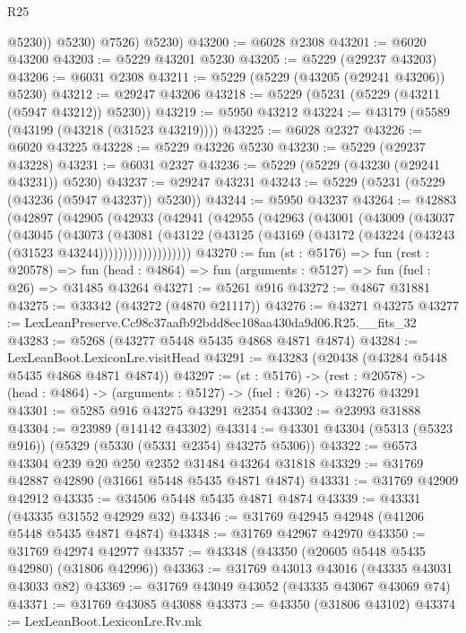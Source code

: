 \begin{lexlean}{R25}
\begin{coremodule}
              @5230))
          @5230)
        @7526)
      @5230)
@43200 := @6028 @2308
@43201 := @6020 @43200
@43203 := @5229 @43201 @5230
@43205 := @5229 (@29237 @43203)
@43206 := @6031 @2308
@43211 := @5229 (@5229 (@43205 (@29241 @43206)) @5230)
@43212 := @29247 @43206
@43218 := @5229 (@5231 (@5229 (@43211 (@5947 @43212)) @5230))
@43219 := @5950 @43212
@43224 := @43179 (@5589 (@43199 (@43218 (@31523 @43219))))
@43225 := @6028 @2327
@43226 := @6020 @43225
@43228 := @5229 @43226 @5230
@43230 := @5229 (@29237 @43228)
@43231 := @6031 @2327
@43236 := @5229 (@5229 (@43230 (@29241 @43231)) @5230)
@43237 := @29247 @43231
@43243 := @5229 (@5231 (@5229 (@43236 (@5947 @43237)) @5230))
@43244 := @5950 @43237
@43264 := @42883
    (@42897
      (@42905
        (@42933
          (@42941
            (@42955
              (@42963
                (@43001
                  (@43009
                    (@43037
                      (@43045
                        (@43073
                          (@43081
                            (@43122
                              (@43125
                                (@43169 (@43172 (@43224 (@43243 (@31523 @43244)))))))))))))))))))
@43270 := fun (st : @5176) =>
  fun (rest : @20578) =>
  fun (head : @4864) => fun (arguments : @5127) => fun (fuel : @26) => @31485 @43264
@43271 := @5261 @916
@43272 := @4867 @31881
@43275 := @33342 (@43272 (@4870 @21117))
@43276 := @43271 @43275
@43277 := LexLeanPreserve.Cc98c37aafb92bdd8ec108aa430da9d06.R25.__fits_32
@43283 := @5268 (@43277 @5448 @5435 @4868 @4871 @4874)
@43284 := LexLeanBoot.LexiconLre.visitHead
@43291 := @43283 (@20438 (@43284 @5448 @5435 @4868 @4871 @4874))
@43297 := (st : @5176) ->
  (rest : @20578) -> (head : @4864) -> (arguments : @5127) -> (fuel : @26) -> @43276 @43291
@43301 := @5285 @916 @43275 @43291 @2354
@43302 := @23993 @31888
@43304 := @23989 (@14142 @43302)
@43314 := @43301 @43304 (@5313 (@5323 @916)) (@5329 (@5330 (@5331 @2354) @43275 @5306))
@43322 := @6573 @43304 @239 @20 @250 @2352 @31484 @43264 @31818
@43329 := @31769 @42887 @42890 (@31661 @5448 @5435 @4871 @4874)
@43331 := @31769 @42909 @42912
@43335 := @34506 @5448 @5435 @4871 @4874
@43339 := @43331 (@43335 @31552 @42929 @32)
@43346 := @31769 @42945 @42948 (@41206 @5448 @5435 @4871 @4874)
@43348 := @31769 @42967 @42970
@43350 := @31769 @42974 @42977
@43357 := @43348 (@43350 (@20605 @5448 @5435 @42980) (@31806 @42996))
@43363 := @31769 @43013 @43016 (@43335 @43031 @43033 @82)
@43369 := @31769 @43049 @43052 (@43335 @43067 @43069 @74)
@43371 := @31769 @43085 @43088
@43373 := @43350 (@31806 @43102)
@43374 := LexLeanBoot.LexiconLre.Rv.mk

\end{coremodule}
\end{lexlean}
